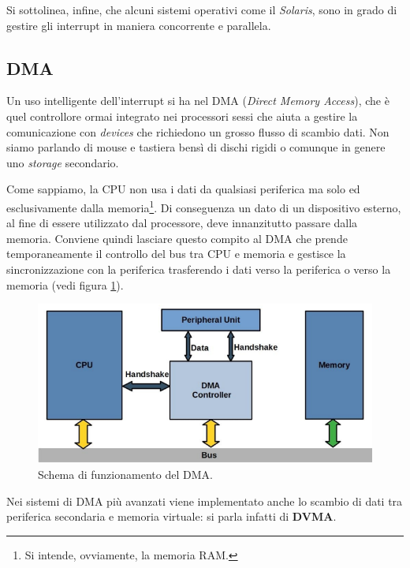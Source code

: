 Si sottolinea, infine, che alcuni sistemi operativi come il \textit{Solaris}, sono in grado di gestire gli interrupt in maniera concorrente e parallela.

% 
\subsection{DMA}
Un uso intelligente dell'interrupt si ha nel DMA (\textit{Direct Memory Access}), che è quel controllore ormai integrato nei processori sessi che aiuta a gestire la comunicazione con \textit{devices} che richiedono un grosso flusso di scambio dati. Non siamo parlando di mouse e tastiera bensì di dischi rigidi o comunque in genere uno \textit{storage} secondario.

Come sappiamo, la CPU non usa i dati da qualsiasi periferica ma solo ed esclusivamente dalla memoria\footnote{Si intende, ovviamente, la memoria RAM.}. Di conseguenza un dato di un dispositivo esterno, al fine di essere utilizzato dal processore, deve innanzitutto passare dalla memoria. Conviene quindi lasciare questo compito al DMA che prende temporaneamente il controllo del bus tra CPU e memoria e gestisce la sincronizzazione con la periferica trasferendo i dati verso la periferica o verso la memoria (vedi figura \ref{fig:DMA}).
\begin{figure}
    \centering
    \includegraphics[width = .7\textwidth]{../res/imgs/IO system/DMA.png}
    \caption{Schema di funzionamento del DMA.}
    \label{fig:DMA}
\end{figure}
Nei sistemi di DMA più avanzati viene implementato anche lo scambio di dati tra periferica secondaria e memoria virtuale: si parla infatti di \textbf{DVMA}.

